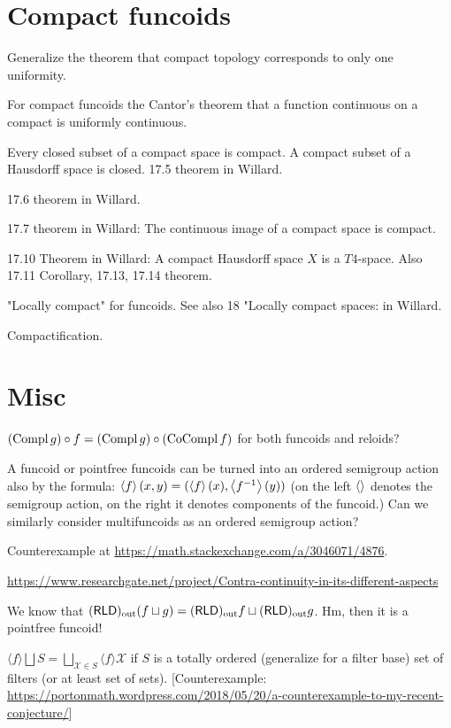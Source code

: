 \documentclass{amsart}
\begin{document}
\section{Compact funcoids}

Generalize the theorem that compact topology corresponds to only one uniformity.

For compact funcoids the Cantor's theorem that a function continuous on a compact is uniformly continuous.

Every closed subset of a compact space is compact. A compact subset of a Hausdorff space is closed. 17.5 theorem in Willard.

17.6 theorem in Willard.

17.7 theorem in Willard: The continuous image of a compact space is compact.

17.10 Theorem in Willard: A compact Hausdorff space $X$ is a $T 4$-space. Also 17.11 Corollary, 17.13, 17.14 theorem.

"Locally compact" for funcoids. See also 18 "Locally compact spaces: in Willard.

Compactification.

\section{Misc}

$(\operatorname{Compl} g)\circ f=(\operatorname{Compl} g)\circ(\operatorname{CoCompl} f)$ for both funcoids and reloids?

A funcoid or pointfree funcoids can be turned into an ordered semigroup action also by the formula: $\left\langle f\right\rangle(x,y)=(\left\langle f\right\rangle(x),\left\langle f^{-1}\right\rangle(y))$ (on the left $\left\langle \right\rangle$ denotes the semigroup action, on the right it denotes components of the funcoid.) Can we similarly consider multifuncoids as an ordered semigroup action?

Counterexample at \url{https://math.stackexchange.com/a/3046071/4876}.

\url{https://www.researchgate.net/project/Contra-continuity-in-its-different-aspects}

We know that $(\mathsf{RLD})_{\mathrm{out}}(f\sqcup g) = (\mathsf{RLD})_{\mathrm{out}} f\sqcup(\mathsf{RLD})_{\mathrm{out}} g$.
Hm, then it is a pointfree funcoid!

\begin{conjecture}
$\langle f \rangle \bigsqcup S = \bigsqcup_{\mathcal{X} \in S} \langle f
\rangle \mathcal{X}$ if $S$ is a totally ordered (generalize for a filter
base) set of filters (or at least set of sets).
[Counterexample: \url{https://portonmath.wordpress.com/2018/05/20/a-counterexample-to-my-recent-conjecture/}]
\end{conjecture}
\end{document}
